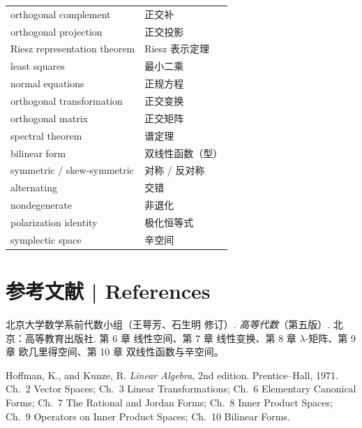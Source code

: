 \documentclass[UTF8,11pt,a4paper]{ctexart}
\begin{document}
\begin{longtable}{@{}p{}p{}@{}}
orthogonal complement & 正交补\\
orthogonal projection & 正交投影\\
Riesz representation theorem & Riesz 表示定理\\
least squares & 最小二乘\\
normal equations & 正规方程\\
orthogonal transformation & 正交变换\\
orthogonal matrix & 正交矩阵\\
spectral theorem & 谱定理\\
bilinear form & 双线性函数（型）\\
symmetric / skew-symmetric & 对称 / 反对称\\
alternating & 交错\\
nondegenerate & 非退化\\
polarization identity & 极化恒等式\\
symplectic space & 辛空间\\
\bottomrule
\end{longtable}
\endgroup

\section*{参考文献 | References}
\begin{enumerate}[label={[\arabic*]},leftmargin=2.6em,itemsep=2pt]
\item 北京大学数学系前代数小组（王萼芳、石生明 修订）. \emph{高等代数}（第五版）. 北京：高等教育出版社. 第 6 章 线性空间、第 7 章 线性变换、第 8 章 $\lambda$-矩阵、第 9 章 欧几里得空间、第 10 章 双线性函数与辛空间。
\item Hoffman, K., and Kunze, R. \emph{Linear Algebra}, 2nd edition. Prentice--Hall, 1971. Ch.~2 Vector Spaces; Ch.~3 Linear Transformations; Ch.~6 Elementary Canonical Forms; Ch.~7 The Rational and Jordan Forms; Ch.~8 Inner Product Spaces; Ch.~9 Operators on Inner Product Spaces; Ch.~10 Bilinear Forms.
\end{enumerate}
\end{document}
